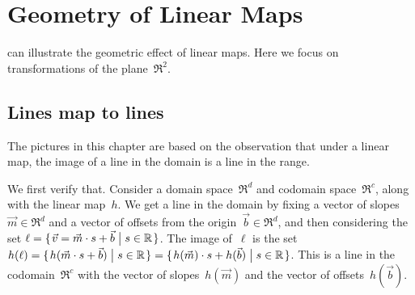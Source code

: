 \chapter{Geometry of Linear Maps}

\Sage{} can illustrate the geometric effect of linear maps.
Here we focus on transformations of the plane~$\Re^2$.  




\section{Lines map to lines}
The pictures in this chapter are 
based on the observation that under a linear map, the image of a line
in the domain is a line in the range.

We first verify that.
Consider a domain space~$\Re^d$ and codomain space~$\Re^c$, along with
the linear map~$h$.
We get a line in the domain by fixing a vector of slopes~$\vec{m}\in\Re^d$
and a vector of offsets from the origin~$\vec{b}\in\Re^d$, 
and then considering the set 
$\ell = \mbox{$\{\hspace{0.1em}\vec{v}=\vec{m}\cdot s +\vec{b}\bigm| s\in\mathbb{R}\hspace{0.1em}\}$}$.
The image of~$\ell$ is the set 
$h(\ell)=\mbox{$\{\hspace{0.1em}h(\vec{m}\cdot s+\vec{b})\bigm| s\in\mathbb{R}\hspace{0.1em}\}$}
=\mbox{$\{\hspace{0.1em}h(\vec{m})\cdot s+h(\vec{b})\bigm| s\in\mathbb{R}\hspace{0.1em}\}$}$.
This is a line in the codomain~$\Re^c$ with the vector of 
slopes~$h(\vec{m})$ and the vector of offsets~$h(\vec{b})$. 

